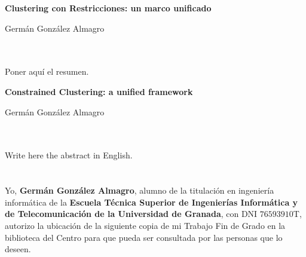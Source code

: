 

\cleardoublepage



\begin{center}
{\large\bfseries  Clustering con Restricciones: un marco unificado}\\
\end{center}
\begin{center}
Germán González Almagro\\
\end{center}

\\

\vspace{0.7cm}
\\

Poner aquí el resumen.
\cleardoublepage


\thispagestyle{empty}


\begin{center}
{\large\bfseries Constrained Clustering: a unified framework}\\
\end{center}
\begin{center}
Germán González Almagro\\
\end{center}

\vspace{0.7cm}
\\

\vspace{0.7cm}
\\

Write here the abstract in English.

\chapter*{}
\thispagestyle{empty}


Yo, \textbf{Germán González Almagro}, alumno de la titulación en ingeniería informática de la \textbf{Escuela Técnica Superior
de Ingenierías Informática y de Telecomunicación de la Universidad de Granada}, con DNI $\mathrm{76593910}$T, autorizo la
ubicación de la siguiente copia de mi Trabajo Fin de Grado en la biblioteca del Centro para que pueda ser
consultada por las personas que lo deseen.

